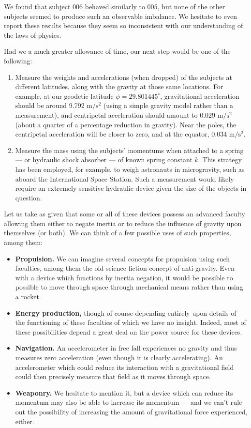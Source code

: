 \documentclass[10pt]{article}
\theoremstyle{definition}
\begin{document}
We found that subject 006 behaved similarly to 005, but none of the other subjects seemed to produce such an observable imbalance.
We hesitate to even report these results because they seem so inconsistent with our understanding of the laws of physics.

Had we a much greater allowance of time, our next step would be one of the following:
\begin{enumerate}
\item Measure the weights and accelerations (when dropped) of the subjects at different latitudes, along with the gravity at those same locations. For example, at our geodetic latitude $\phi=29.801445^\circ$, gravitational acceleration should be around 9.792 $\textrm{m}/\textrm{s}^2$ (using a simple gravity model rather than a measurement), and centripetal acceleration should amount to 0.029 $\textrm{m}/\textrm{s}^2$ (about a quarter of a percentage reduction in gravity). Near the poles, the centripetal acceleration will be closer to zero, and at the equator, 0.034 $\textrm{m}/\textrm{s}^2$.
\item Measure the mass using the subjects' momentums when attached to a spring --- or hydraulic shock absorber --- of known spring constant $k$. This strategy has been employed, for example, to weigh astronauts in microgravity, such as aboard the International Space Station. Such a measurement would likely require an extremely sensitive hydraulic device given the size of the objects in question.
\end{enumerate}

Let us take as given that some or all of these devices possess an advanced faculty allowing them either to negate inertia or to reduce the influence of gravity upon themselves (or both).
We can think of a few possible uses of such properties, among them:
\begin{itemize}
\item \textbf{Propulsion.} We can imagine several concepts for propulsion using such faculties, among them the old science fiction concept of anti-gravity. Even with a device which functions by inertia negation, it would be possible to possible to move through space through mechanical means rather than using a rocket.
\item \textbf{Energy production,} though of course depending entirely upon details of the functioning of these faculties of which we have no insight. Indeed, most of these possibilities depend a great deal on the power source for these devices.
\item \textbf{Navigation.} An accelerometer in free fall experiences no gravity and thus measures zero acceleration (even though it is clearly accelerating). An accelerometer which could reduce its interaction with a gravitational field could then precisely measure that field as it moves through space.
\item \textbf{Weaponry.} We hesitate to mention it, but a device which can reduce its momentum may also be able to increase its momentum --- and we can't rule out the possibility of increasing the amount of gravitational force experienced, either.
\end{itemize}
\end{document}
